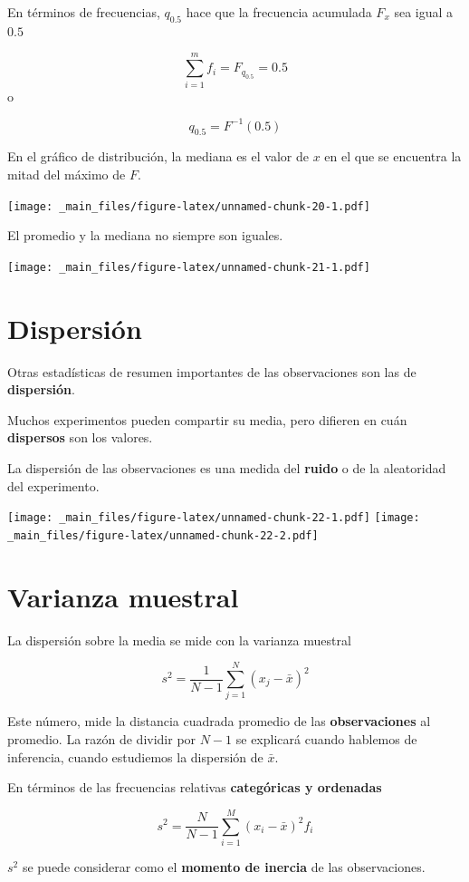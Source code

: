 \documentclass[
]{book}
\begin{document}
En términos de frecuencias, \(q_{0.5}\) hace que la frecuencia acumulada \(F_x\) sea igual a \(0.5\)

\[\sum_{i = 1}^m f_i =F_{q_{0.5}}=0.5\]
o

\[q_{0.5}=F^{-1}(0.5)\]

En el gráfico de distribución, la mediana es el valor de \(x\) en el que se encuentra la mitad del máximo de \(F\).

\texttt{[image: \_main\_files/figure-latex/unnamed-chunk-20-1.pdf]}

El promedio y la mediana no siempre son iguales.

\texttt{[image: \_main\_files/figure-latex/unnamed-chunk-21-1.pdf]}

\hypertarget{dispersiuxf3n}{%
\section{Dispersión}\label{dispersiuxf3n}}

Otras estadísticas de resumen importantes de las observaciones son las de \textbf{dispersión}.

Muchos experimentos pueden compartir su media, pero difieren en cuán \textbf{dispersos} son los valores.

La dispersión de las observaciones es una medida del \textbf{ruido} o de la aleatoridad del experimento.

\texttt{[image: \_main\_files/figure-latex/unnamed-chunk-22-1.pdf]} \texttt{[image: \_main\_files/figure-latex/unnamed-chunk-22-2.pdf]}

\hypertarget{varianza-muestral}{%
\section{Varianza muestral}\label{varianza-muestral}}

La dispersión sobre la media se mide con la varianza muestral

\[s^2=\frac{1}{N-1} \sum_{j=1}^N (x_j-\bar{x})^2\]

Este número, mide la distancia cuadrada promedio de las \textbf{observaciones} al promedio. La razón de dividir por \(N-1\) se explicará cuando hablemos de inferencia, cuando estudiemos la dispersión de \(\bar{x}\).

En términos de las frecuencias relativas \textbf{categóricas y ordenadas}

\[s^2=\frac{N}{N-1} \sum_{i=1}^M (x_i-\bar{x})^2 f_i\]

\(s^2\) se puede considerar como el \textbf{momento de inercia} de las observaciones.
\end{document}
